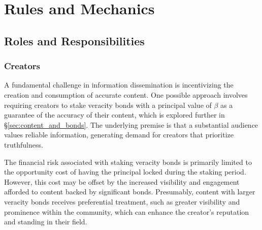 \documentclass{article}
\begin{document}



\section{Rules and Mechanics}

\subsection{Roles and Responsibilities}

\subsubsection{Creators}

A fundamental challenge in information dissemination is incentivizing the creation and consumption of accurate content. One possible approach involves requiring creators to stake veracity bonds with a principal value of $\beta$ as a guarantee of the accuracy of their content, which is explored further in \S\ref{sec:content_and_bonds}. The underlying premise is that a substantial audience values reliable information, generating demand for creators that prioritize truthfulness.  

The financial risk associated with staking veracity bonds is primarily limited to the opportunity cost of having the principal locked during the staking period. However, this cost may be offset by the increased visibility and engagement afforded to content backed by significant bonds. Presumably, content with larger veracity bonds receives preferential treatment, such as greater visibility and prominence within the community, which can enhance the creator's reputation and standing in their field.  
\end{document}
